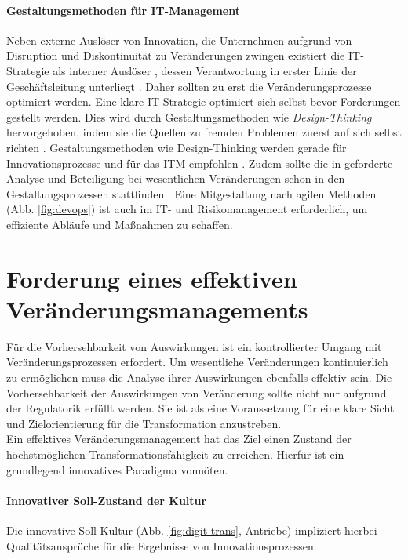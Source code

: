 \paragraph{Gestaltungsmethoden für IT-Management}
Neben externe Auslöser von Innovation, die Unternehmen aufgrund von Disruption und Diskontinuität zu Veränderungen zwingen \cite{Gupta:2017, Fernandez:2020} existiert die IT-Strategie als interner Auslöser \cite{BAIT:2018, Alt2017}, dessen Verantwortung in erster Linie der Geschäftsleitung unterliegt \cite{BAIT:2018}. Daher sollten zu erst die Veränderungsprozesse optimiert werden. Eine klare IT-Strategie optimiert sich selbst bevor Forderungen gestellt werden. Dies wird durch Gestaltungsmethoden wie \emph{Design-Thinking} hervorgehoben, indem sie die Quellen zu fremden Problemen zuerst auf sich selbst richten \cite{yüksel:digit}. Gestaltungsmethoden wie Design-Thinking werden gerade für Innovationsprozesse und für das \ac{ITM} empfohlen \cite{Alt2017, Koch2016}. Zudem sollte die in \citet[AT 8.2]{MaRisk:2017} geforderte Analyse und Beteiligung bei wesentlichen Veränderungen schon in den Gestaltungsprozessen stattfinden \cite{Dorschel2018}. Eine Mitgestaltung nach agilen Methoden (Abb. \ref{fig:devops}) ist auch im IT- und Risikomanagement erforderlich, um effiziente Abläufe und Maßnahmen zu schaffen.

\section{Forderung eines effektiven Veränderungsmanagements}
Für die Vorhersehbarkeit von Auswirkungen ist ein kontrollierter Umgang mit Veränderungsprozessen erfordert. Um wesentliche Veränderungen kontinuierlich zu ermöglichen muss die Analyse ihrer Auswirkungen \cite{MaRisk:2017} ebenfalls effektiv sein. Die Vorhersehbarkeit der Auswirkungen von Veränderung sollte nicht nur aufgrund der Regulatorik erfüllt werden. Sie ist als eine Voraussetzung für eine klare Sicht und Zielorientierung für die Transformation anzustreben.
\medskip
\\
Ein effektives Veränderungsmanagement hat das Ziel einen Zustand der höchstmöglichen Transformationsfähigkeit zu erreichen. Hierfür ist ein grundlegend innovatives Paradigma vonnöten. 

\paragraph{Innovativer Soll-Zustand der Kultur}
Die innovative Soll-Kultur (Abb. \ref{fig:digit-trans}, Antriebe) impliziert hierbei Qualitätsansprüche für die Ergebnisse von Innovationsprozessen.

